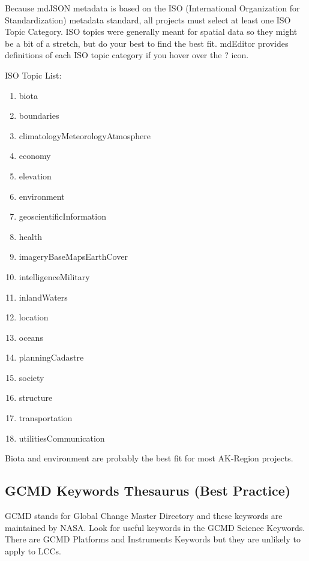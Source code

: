 \documentclass[
]{book}
\makeatletter
\providecommand{\tightlist}{%
  \setlength{\itemsep}{0pt}\setlength{\parskip}{0pt}}
\newenvironment{kframe}{%
\medskip{}
\setlength{\fboxsep}{.8em}
 \def\at@end@of@kframe{}%
 \ifinner\ifhmode%
  \def\at@end@of@kframe{\end{minipage}}%
  \begin{minipage}{\columnwidth}%
 \fi\fi%
 \def\FrameCommand##1{\hskip\@totalleftmargin \hskip-\fboxsep
 \colorbox{shadecolor}{##1}\hskip-\fboxsep
     \hskip-\linewidth \hskip-\@totalleftmargin \hskip\columnwidth}%
 \MakeFramed {\advance\hsize-\width
   \@totalleftmargin\z@ \linewidth\hsize
   \@setminipage}}%
 {\par\unskip\endMakeFramed%
 \at@end@of@kframe}
\newenvironment{rmdblock}[1]
  {
  \begin{itemize}
  \renewcommand{\labelitemi}{
    \raisebox{-.7\height}[0pt][0pt]{
      {\setkeys{Gin}{width=3em,keepaspectratio}\texttt{[image: images/\#1]}}
    }
  }
  \setlength{\fboxsep}{1em}
  \begin{kframe}
  \item
  }
  {
  \end{kframe}
  \end{itemize}
  }
\newenvironment{rmdtip}
  {\begin{rmdblock}{tip}}
  {\end{rmdblock}}
\makeatother
\begin{document}
Because mdJSON metadata is based on the ISO (International Organization for Standardization) metadata standard, all projects must select at least one ISO Topic Category. ISO topics were generally meant for spatial data so they might be a bit of a stretch, but do your best to find the best fit. mdEditor provides definitions of each ISO topic category if you hover over the ? icon.

ISO Topic List:

\begin{enumerate}
\def\labelenumi{\arabic{enumi}.}
\tightlist
\item
  biota
\item
  boundaries
\item
  climatologyMeteorologyAtmosphere
\item
  economy
\item
  elevation
\item
  environment
\item
  geoscientificInformation
\item
  health
\item
  imageryBaseMapsEarthCover
\item
  intelligenceMilitary
\item
  inlandWaters
\item
  location
\item
  oceans
\item
  planningCadastre
\item
  society
\item
  structure
\item
  transportation
\item
  utilitiesCommunication
\end{enumerate}

\begin{rmdtip}
Biota and environment are probably the best fit for most AK-Region
projects.
\end{rmdtip}

\hypertarget{gcmd-keywords-thesaurus-best-practice}{%
\subsection*{GCMD Keywords Thesaurus (Best Practice)}\label{gcmd-keywords-thesaurus-best-practice}}

GCMD stands for Global Change Master Directory and these keywords are maintained by NASA. Look for useful keywords in the GCMD Science Keywords. There are GCMD Platforms and Instruments Keywords but they are unlikely to apply to LCCs.
\end{document}
